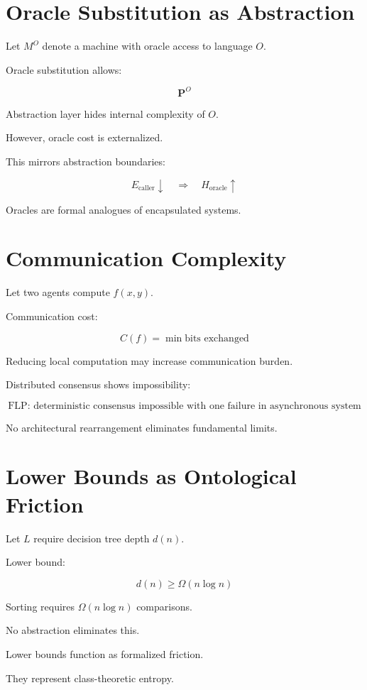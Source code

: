 \documentclass[11pt,openany]{book}
\begin{document}
\section{Oracle Substitution as Abstraction}

Let $M^O$ denote a machine with oracle access to language $O$.

Oracle substitution allows:

\[
\textbf{P}^O
\]

Abstraction layer hides internal complexity of $O$.

However, oracle cost is externalized.

This mirrors abstraction boundaries:

\[
E_{\text{caller}} \downarrow
\quad \Rightarrow \quad
H_{\text{oracle}} \uparrow
\]

Oracles are formal analogues of encapsulated systems.

\section{Communication Complexity}

Let two agents compute $f(x,y)$.

Communication cost:

\[
C(f) = \min \text{bits exchanged}
\]

Reducing local computation may increase communication burden.

Distributed consensus shows impossibility:

\[
\text{FLP: deterministic consensus impossible with one failure in asynchronous system}
\]

No architectural rearrangement eliminates fundamental limits.

\section{Lower Bounds as Ontological Friction}

Let $L$ require decision tree depth $d(n)$.

Lower bound:

\[
d(n) \geq \Omega(n \log n)
\]

Sorting requires $\Omega(n \log n)$ comparisons.

No abstraction eliminates this.

Lower bounds function as formalized friction.

They represent class-theoretic entropy.
\end{document}

